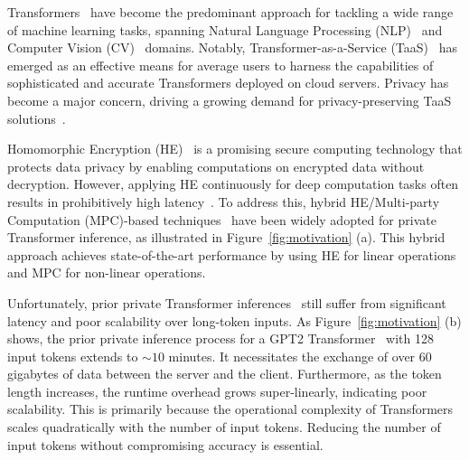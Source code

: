 Transformers~\citep{vaswani2017attention} have become the predominant approach for tackling a wide range of machine learning tasks, spanning Natural Language Processing (NLP)~\citep{xue2024trojllm} and Computer Vision (CV)~\citep{zheng2022trojvit} domains. Notably, Transformer-as-a-Service (TaaS)~\citep{radford2018openai} has emerged as an effective means for average users to harness the capabilities of sophisticated and accurate Transformers deployed on cloud servers.
Privacy has become a major concern, driving a growing demand for privacy-preserving TaaS solutions~\citep{zheng2023primer,hao2022iron-iron,zeng2023mpcvit,santriaji2024dataseal,lou2021safenet}. 

Homomorphic Encryption (HE)~\citep{gentry2009fully} is a promising secure computing technology that protects data privacy by enabling computations on encrypted data without decryption. However, applying HE continuously for deep computation tasks often results in prohibitively high latency~\citep{lou2019glyph,lou2019she,zheng2024ofhe,zhang2023hebridge, jiang2022matcha}. To address this, hybrid HE/Multi-party Computation (MPC)-based techniques~\citep{chen2022thex,zheng2023primer,hao2022iron-iron,zeng2023mpcvit,zhang2023sal, lu2023bumblebee, pang2023bolt, xu2024privcirnet} have been widely adopted for private Transformer inference, as illustrated in Figure~\ref{fig:motivation}
(a). This hybrid approach achieves state-of-the-art performance by using HE for linear operations and MPC for non-linear operations.

Unfortunately, prior private Transformer inferences~\citep{lu2023bumblebee, pang2023bolt,zheng2023primer}  still suffer from significant latency and poor scalability over long-token inputs.  As Figure~\ref{fig:motivation} (b) shows, the prior private inference process for a GPT2 Transformer~\citep{pang2023bolt} with 128 input tokens extends to $\sim10$ minutes. It necessitates the exchange of over 60 gigabytes of data between the server and the client. Furthermore, as the token length increases, the runtime overhead grows super-linearly, indicating poor scalability. This is primarily because the operational complexity of Transformers~\citep{vaswani2017attention, kim2022LTP} scales quadratically with the number of input tokens. Reducing the number of input tokens without compromising accuracy is essential. 

